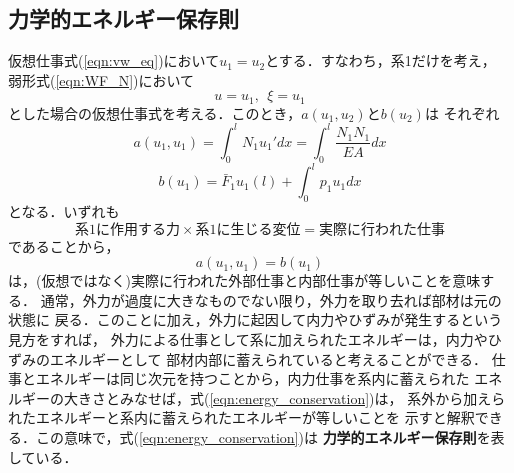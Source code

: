 \documentclass[10pt,a4j]{jarticle}
\begin{document}
\subsection{力学的エネルギー保存則}
仮想仕事式(\ref{eqn:vw_eq})において$u_1=u_2$とする．すなわち，系1だけを考え，
弱形式(\ref{eqn:WF_N})において
\[
	u=u_1, \ \ \xi=u_1
\]
とした場合の仮想仕事式を考える．このとき，$a(u_1,u_2)$と$b(u_2)$は
それぞれ
\begin{equation}
	a(u_1,u_1)=\int_0^l N_1u_1'dx = \int_0^l\frac{N_1N_1}{EA}dx
	\label{eqn:w_int}
\end{equation}
\begin{equation}
	b(u_1)=\bar F_1 u_1(l)+\int_0^l p_1 u_1dx
	\label{eqn:w_ext}
\end{equation}
となる．いずれも
\[
	系1に作用する力 \times 系1に生じる変位 = 実際に行われた仕事
\]
であることから，
\begin{equation}
	a(u_1,u_1)=b(u_1)
	\label{eqn:energy_conservation}
\end{equation}
は，(仮想ではなく)実際に行われた外部仕事と内部仕事が等しいことを意味する．
通常，外力が過度に大きなものでない限り，外力を取り去れば部材は元の状態に
戻る．このことに加え，外力に起因して内力やひずみが発生するという見方をすれば，
外力による仕事として系に加えられたエネルギーは，内力やひずみのエネルギーとして
部材内部に蓄えられていると考えることができる．
仕事とエネルギーは同じ次元を持つことから，内力仕事を系内に蓄えられた
エネルギーの大きさとみなせば，式(\ref{eqn:energy_conservation})は，
系外から加えられたエネルギーと系内に蓄えられたエネルギーが等しいことを
示すと解釈できる．この意味で，式(\ref{eqn:energy_conservation})は
{\bf 力学的エネルギー保存則}を表している．
\end{document}
